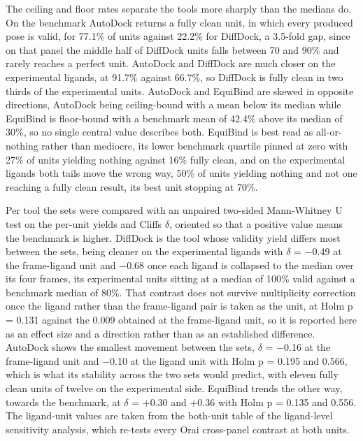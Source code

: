 The ceiling and floor rates separate the tools more sharply than the medians do. On the benchmark AutoDock returns a fully clean unit, in which every produced pose is valid, for 77.1\% of units against 22.2\% for DiffDock, a 3.5-fold gap, since on that panel the middle half of DiffDock units falls between 70 and 90\% and rarely reaches a perfect unit. AutoDock and DiffDock are much closer on the experimental ligands, at 91.7\% against 66.7\%, so DiffDock is fully clean in two thirds of the experimental units. AutoDock and EquiBind are skewed in opposite directions, AutoDock being ceiling-bound with a mean below its median while EquiBind is floor-bound with a benchmark mean of 42.4\% above its median of 30\%, so no single central value describes both. EquiBind is best read as all-or-nothing rather than mediocre, its lower benchmark quartile pinned at zero with 27\% of units yielding nothing against 16\% fully clean, and on the experimental ligands both tails move the wrong way, 50\% of units yielding nothing and not one reaching a fully clean result, its best unit stopping at 70\%.

Per tool the sets were compared with an unpaired two-sided Mann-Whitney U test on the per-unit yields and Cliff\textquotesingle s \ensuremath{\delta}, oriented so that a positive value means the benchmark is higher. DiffDock is the tool whose validity yield differs most between the sets, being cleaner on the experimental ligands with \ensuremath{\delta} = \ensuremath{-}0.49 at the frame-ligand unit and \ensuremath{-}0.68 once each ligand is collapsed to the median over its four frames, its experimental units sitting at a median of 100\% valid against a benchmark median of 80\%. That contrast does not survive multiplicity correction once the ligand rather than the frame-ligand pair is taken as the unit, at Holm p = 0.131 against the 0.009 obtained at the frame-ligand unit, so it is reported here as an effect size and a direction rather than as an established difference. AutoDock shows the smallest movement between the sets, \ensuremath{\delta} = \ensuremath{-}0.16 at the frame-ligand unit and \ensuremath{-}0.10 at the ligand unit with Holm p = 0.195 and 0.566, which is what its stability across the two sets would predict, with eleven fully clean units of twelve on the experimental side. EquiBind trends the other way, towards the benchmark, at \ensuremath{\delta} = +0.30 and +0.36 with Holm p = 0.135 and 0.556. The ligand-unit values are taken from the both-unit table of the ligand-level sensitivity analysis, which re-tests every Orai cross-panel contrast at both units.


